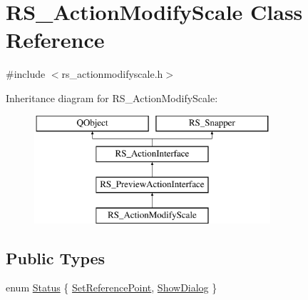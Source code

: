 \hypertarget{classRS__ActionModifyScale}{\section{R\-S\-\_\-\-Action\-Modify\-Scale Class Reference}
\label{classRS__ActionModifyScale}
}


{\ttfamily \#include $<$rs\-\_\-actionmodifyscale.\-h$>$}

Inheritance diagram for R\-S\-\_\-\-Action\-Modify\-Scale\-:\begin{figure}[H]
\begin{center}
\leavevmode
\includegraphics[height=4.000000cm]{classRS__ActionModifyScale}
\end{center}
\end{figure}
\subsection*{Public Types}
\begin{DoxyCompactItemize}
\item 
enum \hyperlink{classRS__ActionModifyScale_a8ec0d4f81f0f4d524b7234d3597c4b48}{Status} \{ \hyperlink{classRS__ActionModifyScale_a8ec0d4f81f0f4d524b7234d3597c4b48a19e764e6d6c834924e54d7f741b4c51d}{Set\-Reference\-Point}, 
\hyperlink{classRS__ActionModifyScale_a8ec0d4f81f0f4d524b7234d3597c4b48a1b7e756acf074c18b7aa78cd457795e9}{Show\-Dialog}
 \}
\end{DoxyCompactItemize}

